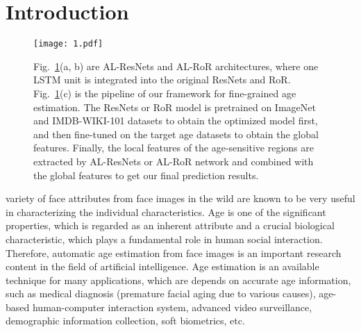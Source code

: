 \documentclass[journal]{IEEEtran}
\begin{document}
\section{Introduction}
\begin{figure}[t]
\centering
\texttt{[image: 1.pdf]}
\caption{Fig.~\ref{fig:basicframework}(a, b) are AL-ResNets and AL-RoR architectures, where one LSTM unit is integrated into the original ResNets and RoR. Fig.~\ref{fig:basicframework}(c) is the pipeline of our framework for fine-grained age estimation. The ResNets or RoR model is pretrained on ImageNet and IMDB-WIKI-101 datasets to obtain the optimized model first, and then fine-tuned on the target age datasets to obtain the global features. Finally, the local features of the age-sensitive regions are extracted by AL-ResNets or AL-RoR network and combined with the global features to get our final prediction results.}
\label{fig:basicframework}
\end{figure}
 variety of face attributes from face images in the wild are known to be very useful in characterizing the individual characteristics. Age is one of the significant properties, which is regarded as an inherent attribute and a crucial biological characteristic, which plays a fundamental role in human social interaction. Therefore, automatic age estimation from face images is an important research content in the field of artificial intelligence. Age estimation is an available technique for many applications, which are depends on accurate age information, such as medical diagnosis (premature facial aging due to various causes), age-based human-computer interaction system, advanced video surveillance, demographic information collection, soft biometrics, etc.
\par
\end{document}
